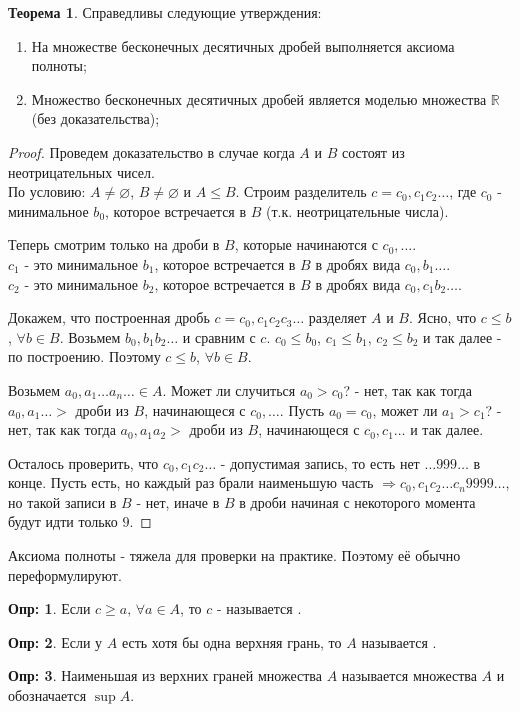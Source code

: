 \documentclass[12pt]{article}
\theoremstyle{definition}
\newtheorem{defn}{Опр:}
\newtheorem{theorem}{Теорема}
\begin{document}
\begin{theorem}
Справедливы следующие утверждения:
\begin{enumerate}
	\item На множестве бесконечных десятичных дробей выполняется аксиома полноты;
	\item Множество бесконечных десятичных дробей является моделью множества $\mathbb{R}$ (без доказательства);
\end{enumerate}
\end{theorem}
\begin{proof}
	Проведем доказательство в случае когда $A$ и $B$ состоят из неотрицательных чисел.\\
	По условию: $A \neq \varnothing$, $B \neq \varnothing$ и $A \leq B$. Строим разделитель $c = c_0{,}c_1c_2\dotsc$, где $c_0$ - минимальное $b_0$, которое встречается в $B$ (т.к. неотрицательные числа). 
	
	Теперь смотрим только на дроби в $B$, которые начинаются с $c_0{,}\dotsc$. \\
	$c_1$ - это минимальное $b_1$, которое встречается в $B$ в дробях вида $c_0{,}b_1\dotsc$.\\
	$c_2$ - это минимальное $b_2$, которое встречается в $B$ в дробях вида $c_0{,}c_1b_2\dotsc$.
	
	Докажем, что построенная дробь $c = c_0{,}c_1c_2c_3\dotsc$ разделяет $A$ и $B$. Ясно, что $c \leq b$, $\forall b \in B$. Возьмем $b_0{,}b_1b_2\dotsc$ и сравним с $c$. $c_0 \leq b_0$, $c_1 \leq b_1$, $c_2 \leq b_2$ и так далее - по построению. Поэтому $c \leq b$, $\forall b \in B$.
	
	Возьмем $a_0{,}a_1\dotsc a_n\dotsc \in A$. Может ли случиться $a_0 > c_0$? - нет, так как тогда $a_0{,}a_1 \dotsc  >$ дроби из $B$, начинающеся с $c_0{,}\dotsc$. Пусть $a_0 = c_0$, может ли $a_1 > c_1$? - нет, так как тогда $a_0{,}a_1a_2 >$ дроби из $B$, начинающеся с $c_0{,}c_1\dotsc$ и так далее.
	
	Осталось проверить, что $c_0{,}c_1c_2\dotsc$ - допустимая запись, то есть нет $\dotsc999\dotsc$ в конце. Пусть есть, но каждый раз брали наименьшую часть $\Rightarrow c_0{,}c_1c_2\dotsc c_n9999\dotsc$, но такой записи в $B$ - нет, иначе в $B$ в дроби начиная с некоторого момента будут идти только $9$.
\end{proof}

Аксиома полноты - тяжела для проверки на практике. Поэтому её обычно переформулируют.

\begin{defn}
	Если $c \geq a, \,\forall a \in A$, то $c$ - называется .
\end{defn}
\begin{defn}
	Если у $A$ есть хотя бы одна верхняя грань, то $A$ называется .
\end{defn}
\begin{defn}
	Наименьшая из верхних граней множества $A$ называется  множества $A$ и обозначается $\sup{A}$.
\end{defn}
\end{document}
